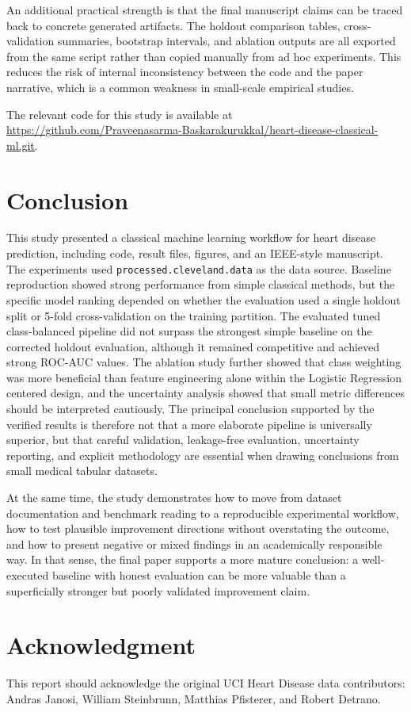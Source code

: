 \documentclass[conference]{IEEEtran}
\begin{document}
An additional practical strength is that the final manuscript claims can be traced back to concrete generated artifacts. The holdout comparison tables, cross-validation summaries, bootstrap intervals, and ablation outputs are all exported from the same script rather than copied manually from ad hoc experiments. This reduces the risk of internal inconsistency between the code and the paper narrative, which is a common weakness in small-scale empirical studies.

The relevant code for this study is available at \url{https://github.com/Praveenasarma-Baskarakurukkal/heart-disease-classical-ml.git}.

\section{Conclusion}
This study presented a classical machine learning workflow for heart disease prediction, including code, result files, figures, and an IEEE-style manuscript. The experiments used \texttt{processed.cleveland.data} as the data source. Baseline reproduction showed strong performance from simple classical methods, but the specific model ranking depended on whether the evaluation used a single holdout split or 5-fold cross-validation on the training partition. The evaluated tuned class-balanced pipeline did not surpass the strongest simple baseline on the corrected holdout evaluation, although it remained competitive and achieved strong ROC-AUC values. The ablation study further showed that class weighting was more beneficial than feature engineering alone within the Logistic Regression centered design, and the uncertainty analysis showed that small metric differences should be interpreted cautiously. The principal conclusion supported by the verified results is therefore not that a more elaborate pipeline is universally superior, but that careful validation, leakage-free evaluation, uncertainty reporting, and explicit methodology are essential when drawing conclusions from small medical tabular datasets.

At the same time, the study demonstrates how to move from dataset documentation and benchmark reading to a reproducible experimental workflow, how to test plausible improvement directions without overstating the outcome, and how to present negative or mixed findings in an academically responsible way. In that sense, the final paper supports a more mature conclusion: a well-executed baseline with honest evaluation can be more valuable than a superficially stronger but poorly validated improvement claim.

\section*{Acknowledgment}
This report should acknowledge the original UCI Heart Disease data contributors: Andras Janosi, William Steinbrunn, Matthias Pfisterer, and Robert Detrano.



\end{document}
